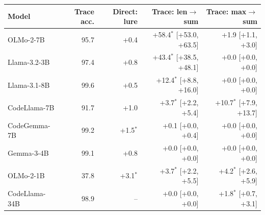 \begin{tabular}{@{}lrrrr@{}}
\toprule
Model & Trace acc. & Direct: lure & Trace: len$\to$sum & Trace: max$\to$sum \\
\midrule
OLMo-2-7B & 95.7 & +0.4 & +58.4$^{*}$ [+53.0, +63.5] & +1.9 [+1.1, +3.0] \\
Llama-3.2-3B & 97.4 & +0.8 & +43.4$^{*}$ [+38.5, +48.1] & +0.0 [+0.0, +0.0] \\
Llama-3.1-8B & 99.6 & +0.5 & +12.4$^{*}$ [+8.8, +16.0] & +0.0 [+0.0, +0.0] \\
CodeLlama-7B & 91.7 & +1.0 & +3.7$^{*}$ [+2.2, +5.4] & +10.7$^{*}$ [+7.9, +13.7] \\
CodeGemma-7B & 99.2 & +1.5$^{*}$ & +0.1 [+0.0, +0.4] & +0.0 [+0.0, +0.0] \\
Gemma-3-4B & 99.1 & +0.8 & +0.0 [+0.0, +0.0] & +0.0 [+0.0, +0.0] \\
OLMo-2-1B & 37.8 & +3.1$^{*}$ & +3.7$^{*}$ [+2.2, +5.5] & +4.2$^{*}$ [+2.6, +5.9] \\
CodeLlama-34B & 98.9 & -- & +0.0 [+0.0, +0.0] & +1.8$^{*}$ [+0.7, +3.1] \\
\bottomrule
\end{tabular}
